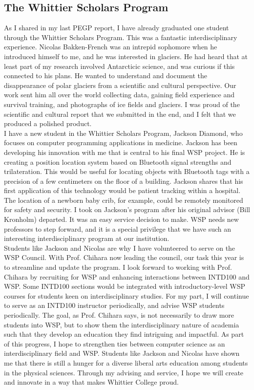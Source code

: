 \documentclass[../../../main.tex]{subfiles}
\begin{document}
\subsection{The Whittier Scholars Program}

As I shared in my last PEGP report, I have already graduated one student through the Whittier Scholars Program.  This was a fantastic interdisciplinary experience.  Nicolas Bakken-French was an intrepid sophomore when he introduced himself to me, and he was interested in glaciers.  He had heard that at least part of my research involved Antarcticic science, and was curious if this connected to his plans.  He wanted to understand and document the disappearance of polar glaciers from a scientific and cultural perspective.  Our work sent him all over the world collecting data, gaining field experience and survival training, and photographs of ice fields and glaciers.  I was proud of the scientific and cultural report that we submitted in the end, and I felt that we produced a polished product.
\\
\vspace{0.15cm}
I have a new student in the Whittier Scholars Program, Jackson Diamond, who focuses on computer programming applications in medicine.  Jackson has been developing his innovation with me that is central to his final WSP project.  He is creating a position location system based on Bluetooth signal strengths and trilateration.  This would be useful for locating objects with Bluetooth tags with a precision of a few centimeters on the floor of a building.  Jackson shares that his first application of this technology would be patient tracking within a hospital.  The location of a newborn baby crib, for example, could be remotely monitored for safety and security.  I took on Jackson's program after his original advisor (Bill Kronholm) departed.  It was an easy service decision to make.  WSP needs new professors to step forward, and it is a special privilege that we have such an interesting interdisciplinary program at our institution.
\\
\vspace{0.15cm}
Students like Jackson and Nicolas are why I have volunteered to serve on the WSP Council.  With Prof. Chihara now leading the council, our task this year is to streamline and update the program.  I look forward to working with Prof. Chihara by recruiting for WSP and enhancing interactions between INTD100 and WSP.  Some INTD100 sections would be integrated with introductory-level WSP courses for students keen on interdisciplinary studies.  For my part, I will continue to serve as an INTD100 instructor periodically, and advise WSP students periodically.  The goal, as Prof. Chihara says, is not necessarily to draw more students into WSP, but to show them the interdisciplinary nature of academia such that they develop an education they find intriguing and impactful.  As part of this progress, I hope to strengthen ties between computer science as an interdisciplinary field and WSP.  Students like Jackson and Nicolas have shown me that there is still a hunger for a diverse liberal arts education among students in the physical sciences.  Through my advising and service, I hope we will create and innovate in a way that makes Whittier College proud.
\end{document}
